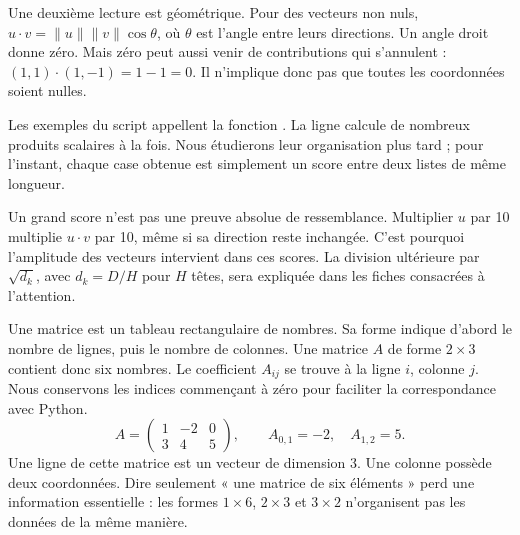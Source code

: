 Une deuxième lecture est géométrique. Pour des vecteurs non nuls,
\(u\cdot v=\|u\|\|v\|\cos\theta\), où \(\theta\) est l'angle
entre leurs directions. Un angle droit donne zéro. Mais zéro
peut aussi venir de contributions qui s'annulent :
\((1,1)\cdot(1,-1)=1-1=0\). Il n'implique donc pas que toutes
les coordonnées soient nulles.

Les exemples du script appellent la fonction
. La ligne
 calcule de nombreux produits
scalaires à la fois. Nous étudierons leur organisation plus tard ;
pour l'instant, chaque case obtenue est simplement un score
entre deux listes de même longueur.

Un grand score n'est pas une preuve absolue de ressemblance.
Multiplier \(u\) par 10 multiplie \(u\cdot v\) par 10,
même si sa direction reste inchangée. C'est pourquoi l'amplitude
des vecteurs intervient dans ces scores. La division ultérieure
par \(\sqrt{d_k}\), avec \(d_k=D/H\) pour \(H\) têtes,
sera expliquée dans les fiches consacrées à l'attention.



Une matrice est un tableau rectangulaire de nombres. Sa forme indique
d'abord le nombre de lignes, puis le nombre de colonnes. Une matrice
\(A\) de forme \(2\times3\) contient donc six nombres.
Le coefficient \(A_{ij}\) se trouve à la ligne \(i\), colonne \(j\).
Nous conservons les indices commençant à zéro pour faciliter la
correspondance avec Python.
\[
 A=\begin{pmatrix}1&-2&0\\3&4&5\end{pmatrix},
 \qquad A_{0,1}=-2,\quad A_{1,2}=5.
\]
Une ligne de cette matrice est un vecteur de dimension 3.
Une colonne possède deux coordonnées. Dire seulement « une matrice
de six éléments » perd une information essentielle : les formes
\(1\times6\), \(2\times3\) et \(3\times2\) n'organisent pas
les données de la même manière.

